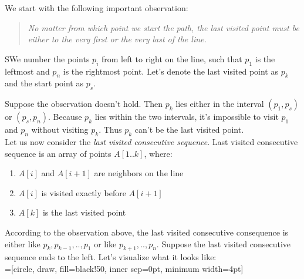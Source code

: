 
We start with the following important observation:

\begin{quote}
  \textit{No matter from which point we start the path, the last visited point must be either to the very first or the very last of the line.}
\end{quote}

SWe number the points $p_i$ from left to right on the line, such that $p_1$ is the leftmost and $p_n$ is the rightmost point. Let's denote the last visited point as $p_k$ and the start point as $p_s$.

Suppose the observation doesn't hold. Then $p_k$ lies either in the interval $(p_1, p_s)$ or $(p_s, p_n)$. Because $p_k$ lies within the two intervals, it's impossible to visit $p_1$ and $p_n$ without visiting $p_k$. Thus $p_k$ can't be the last visited point.\\

Let us now consider the \textit{last visited consecutive sequence}. Last visited consecutive sequence is an array of points $A[1..k]$, where:

\begin{enumerate}
\item $A[i]$ and $A[i+1]$ are neighbors on the line
\item $A[i]$ is visited exactly before $A[i+1]$
\item $A[k]$ is the last visited point
\end{enumerate}

According to the observation above, the last visited consecutive consequence is either like $p_k, p_{k-1}, .., p_1$ or like $p_{k+1}, .., p_n$. Suppose the last visited consecutive sequence ends to the left. Let's visualize what it looks like:\\

=[circle, draw, fill=black!50,
                        inner sep=0pt, minimum width=4pt]
\quad


